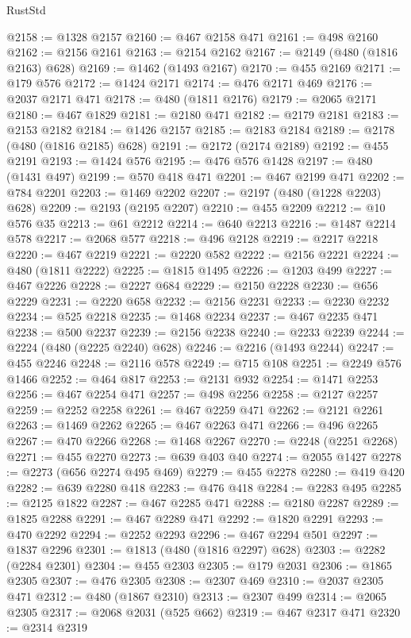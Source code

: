 \begin{lexlean}{RustStd}
\begin{coremodule}
@2158 := @1328 @2157
@2160 := @467 @2158 @471
@2161 := @498 @2160
@2162 := @2156 @2161
@2163 := @2154 @2162
@2167 := @2149 (@480 (@1816 @2163) @628)
@2169 := @1462 (@1493 @2167)
@2170 := @455 @2169
@2171 := @179 @576
@2172 := @1424 @2171
@2174 := @476 @2171 @469
@2176 := @2037 @2171 @471
@2178 := @480 (@1811 @2176)
@2179 := @2065 @2171
@2180 := @467 @1829
@2181 := @2180 @471
@2182 := @2179 @2181
@2183 := @2153 @2182
@2184 := @1426 @2157
@2185 := @2183 @2184
@2189 := @2178 (@480 (@1816 @2185) @628)
@2191 := @2172 (@2174 @2189)
@2192 := @455 @2191
@2193 := @1424 @576
@2195 := @476 @576 @1428
@2197 := @480 (@1431 @497)
@2199 := @570 @418 @471
@2201 := @467 @2199 @471
@2202 := @784 @2201
@2203 := @1469 @2202
@2207 := @2197 (@480 (@1228 @2203) @628)
@2209 := @2193 (@2195 @2207)
@2210 := @455 @2209
@2212 := @10 @576 @35
@2213 := @61 @2212
@2214 := @640 @2213
@2216 := @1487 @2214 @578
@2217 := @2068 @577
@2218 := @496 @2128
@2219 := @2217 @2218
@2220 := @467 @2219
@2221 := @2220 @582
@2222 := @2156 @2221
@2224 := @480 (@1811 @2222)
@2225 := @1815 @1495
@2226 := @1203 @499
@2227 := @467 @2226
@2228 := @2227 @684
@2229 := @2150 @2228
@2230 := @656 @2229
@2231 := @2220 @658
@2232 := @2156 @2231
@2233 := @2230 @2232
@2234 := @525 @2218
@2235 := @1468 @2234
@2237 := @467 @2235 @471
@2238 := @500 @2237
@2239 := @2156 @2238
@2240 := @2233 @2239
@2244 := @2224 (@480 (@2225 @2240) @628)
@2246 := @2216 (@1493 @2244)
@2247 := @455 @2246
@2248 := @2116 @578
@2249 := @715 @108
@2251 := @2249 @576 @1466
@2252 := @464 @817
@2253 := @2131 @932
@2254 := @1471 @2253
@2256 := @467 @2254 @471
@2257 := @498 @2256
@2258 := @2127 @2257
@2259 := @2252 @2258
@2261 := @467 @2259 @471
@2262 := @2121 @2261
@2263 := @1469 @2262
@2265 := @467 @2263 @471
@2266 := @496 @2265
@2267 := @470 @2266
@2268 := @1468 @2267
@2270 := @2248 (@2251 @2268)
@2271 := @455 @2270
@2273 := @639 @403 @40
@2274 := @2055 @1427
@2278 := @2273 (@656 @2274 @495 @469)
@2279 := @455 @2278
@2280 := @419 @420
@2282 := @639 @2280 @418
@2283 := @476 @418
@2284 := @2283 @495
@2285 := @2125 @1822
@2287 := @467 @2285 @471
@2288 := @2180 @2287
@2289 := @1825 @2288
@2291 := @467 @2289 @471
@2292 := @1820 @2291
@2293 := @470 @2292
@2294 := @2252 @2293
@2296 := @467 @2294 @501
@2297 := @1837 @2296
@2301 := @1813 (@480 (@1816 @2297) @628)
@2303 := @2282 (@2284 @2301)
@2304 := @455 @2303
@2305 := @179 @2031
@2306 := @1865 @2305
@2307 := @476 @2305
@2308 := @2307 @469
@2310 := @2037 @2305 @471
@2312 := @480 (@1867 @2310)
@2313 := @2307 @499
@2314 := @2065 @2305
@2317 := @2068 @2031 (@525 @662)
@2319 := @467 @2317 @471
@2320 := @2314 @2319

\end{coremodule}
\end{lexlean}
